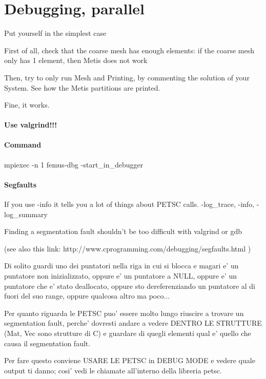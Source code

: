 \documentclass[10pt]{book}
\begin{document}
  \chapter{Debugging, parallel}
 
 Put yourself in the simplest case
 
 First of all, check that the coarse mesh has enough elements: if the coarse mesh only has 1 element, then Metis does not work
 
 Then, try to only run Mesh and Printing, by commenting the solution of your System. See how the Metis partitions are printed.
 
 Fine, it works.
 
  \subsubsection{Use valgrind!!!}

 \subsubsection{Command}

 mpiexec -n 1 femus-dbg -start\_in\_debugger

 \subsubsection{Segfaults}

If you use -info it tells you a lot of things about PETSC calls.
-log\_trace, -info, -log\_summary

Finding a segmentation fault shouldn't be too difficult with valgrind or gdb

(see also this link:
http://www.cprogramming.com/debugging/segfaults.html )

Di solito guardi uno dei puntatori nella riga in cui si 
blocca e magari e' un puntatore non inizializzato,
oppure e' un puntatore a NULL, 
oppure e' un puntatore che e' stato deallocato,
oppure sto dereferenziando un puntatore al di fuori del suo range,
oppure qualcosa altro ma poco...

Per quanto riguarda le PETSC puo' essere molto lungo riuscire 
a trovare un segmentation fault, perche' dovresti 
andare a vedere DENTRO LE STRUTTURE (Mat, Vec sono strutture di C)
e guardare di quegli elementi qual e' quello 
che causa il segmentation fault.

Per fare questo conviene USARE LE PETSC in DEBUG MODE 
e vedere quale output ti danno;
cosi' vedi le chiamate all'interno della libreria petsc.
  
\end{document}
